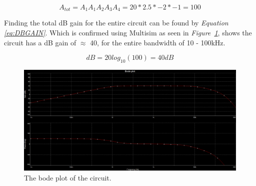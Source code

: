 $$A_{tot} = A_1A_1A_2A_3A_4 = 20*2.5*-2*-1 = 100$$

Finding the total dB gain for the entire circuit can be found by \textit{Equation \ref{eq:DBGAIN}}. 
Which is confirmed using Multisim as seen in \textit{Figure~\ref{fig:bode}},
shows the circuit has a dB gain of $\approx$ 40, for the entire bandwidth of 10 - 100kHz.

$$dB = 20log_{10}(100) = 40dB$$

\begin{figure}[h]
    \centering
    \includegraphics[width=1.0\textwidth]{graphics/bodeNew.png}
    \caption{The bode plot of the circuit.}
    \label{fig:bode}
\end{figure}







\clearpage



